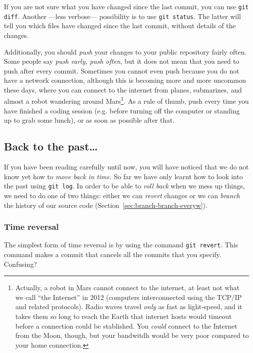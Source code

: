 If you are not sure what you have changed since the last commit, 
you can use \verb+git diff+. Another ---less verbose--- possibility
is to use \verb+git status+. The latter will tell you
which files have changed since the last commit, without details of the
changes.

Additionally, you should \emph{push} your changes to your public
repository fairly often. Some people say \emph{push early, push
  often}, but it does not mean that you need to push after every
commit. Sometimes 
you cannot even push because you do not have a network connection,
although this is becoming more and more uncommon these days, where you
can connect to the internet from planes, submarines, and almost a
robot wandering around Mars\footnote{Actually, a robot in Mars cannot
  connect to the internet, at least not what we call ``the Internet'' 
  in 2012 (computers interconnected using the TCP/IP and related protocols). 
  Radio waves travel \emph{only} as fast as light-speed, and it
  takes them so long to reach the Earth that internet hosts would
  timeout before a connection could be stablished. 
  You \emph{could} connect to
  the Internet from the Moon, though, but your bandwitdh would be
  very poor compared to your home connection.}. 
As a rule of thumb, push every time you 
have finished a coding session (e.g. before turning off the computer
or standing up to grab some lunch), or as soon as possible after that.

\subsection{Back to the past\ldots}
\label{sec:branching}

If you have been reading carefully until now, you will have noticed
that we do not know yet how to \emph{move back in time}. So far we
have only learnt how to look into the past using \verb+git log+. In
order to be able to \emph{roll back} when we mess up things, we need
to do one of two things: either we can \emph{revert} changes or we can
\emph{branch} the history of our source code
(Section~\ref{sec:branch-branch-everyw}).

\subsubsection{Time reversal}
\label{sec:time-reversal}

The simplest form of time reversal is by using the command 
\verb+git revert+. This command makes a commit 
that cancels all the commits that
you specify. Confusing? 

